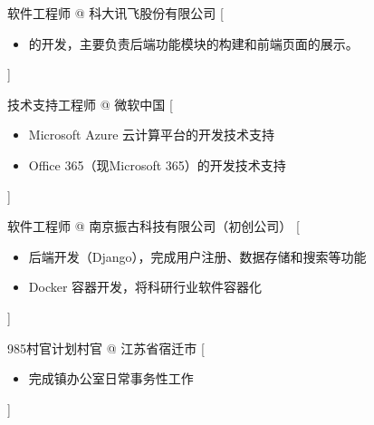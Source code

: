 \documentclass[zh]{resume}
\begin{document}
\begin{experiences}
    {软件工程师 @ 科大讯飞股份有限公司}%
    [\begin{itemize}
      \item {}的开发，主要负责后端功能模块的构建和前端页面的展示。
    \end{itemize}]

  \separator{0.5ex}
    {技术支持工程师 @ \icon{\faMicrosoft}微软中国}%
    [\begin{itemize}
      \item Microsoft Azure 云计算平台的开发技术支持
      \item Office 365（现Microsoft 365）的开发技术支持
    \end{itemize}]
  
  \separator{0.5ex}
    {软件工程师 @ 南京振古科技有限公司（初创公司）}%
    [\begin{itemize}
      \item 后端开发（Django），完成用户注册、数据存储和搜索等功能
      \item Docker 容器开发，将科研行业软件容器化
    \end{itemize}]
  
  \separator{0.5ex}
    {985村官计划村官 @ 江苏省宿迁市}%
    [\begin{itemize}
      \item 完成镇办公室日常事务性工作
    \end{itemize}]
\end{experiences}
\end{document}
